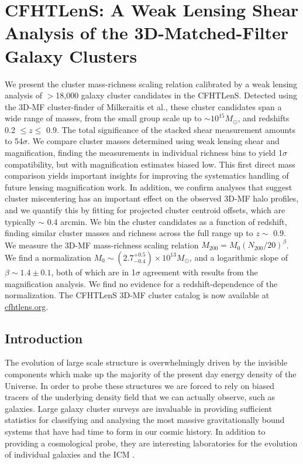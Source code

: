 \chapter{CFHTLenS: A Weak Lensing Shear Analysis of the 3D-Matched-Filter Galaxy Clusters}
\label{ch4}

We present the cluster mass-richness scaling relation calibrated by a weak lensing analysis of $>$18,000 galaxy cluster candidates in the \acf{CFHTLenS}. Detected using the \acf{3D-MF} cluster-finder of Milkeraitis et al., these cluster candidates span a wide range of masses, from the small group scale up to $\sim10^{15} M_{\odot}$, and redshifts 0.2 $\leq z\leq$ 0.9. The total significance of the stacked shear measurement amounts to 54$\sigma$. We compare cluster masses determined using weak lensing shear and magnification, finding the measurements in individual richness bins to yield 1$\sigma$ compatibility, but with magnification estimates biased low. This first direct mass comparison yields important insights for improving the systematics handling of future lensing magnification work. In addition, we confirm analyses that suggest cluster miscentering has an important effect on the observed \ac{3D-MF} halo profiles, and we quantify this by fitting for projected cluster centroid offsets, which are typically $\sim$ 0.4 arcmin. We bin the cluster candidates as a function of redshift, finding similar cluster masses and richness across the full range up to $z \sim$ 0.9. We measure the \ac{3D-MF} mass-richness scaling relation $M_{200 } = M_0 (N_{200} / 20)^\beta$. We find a normalization $M_0 \sim (2.7^{+0.5}_{-0.4}) \times 10^{13} M_{\odot}$, and a logarithmic slope of $\beta \sim 1.4 \pm 0.1$, both of which are in 1$\sigma$ agreement with results from the magnification analysis. We find no evidence for a redshift-dependence of the normalization. The \ac{CFHTLenS} \ac{3D-MF} cluster catalog is now available at \url{cfhtlens.org}.



\section{Introduction}
\label{sec:intro4}
The evolution of large scale structure is overwhelmingly driven by the invisible components which make up the majority of the present day energy density of the Universe. In order to probe these structures we are forced to rely on biased tracers of the underlying density field that we can actually observe, such as galaxies. Large galaxy cluster surveys are invaluable in providing sufficient statistics for classifying and analysing the most massive gravitationally bound systems that have had time to form in our cosmic history. In addition to providing a cosmological probe, they are interesting laboratories for the evolution of individual galaxies and the \ac{ICM} \citep{Voit05}.


